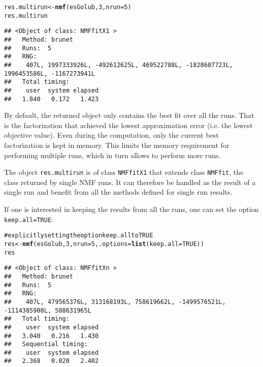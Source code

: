 \documentclass[a4paper]{article}\usepackage{graphicx, color}
\makeatletter
\newcommand{\hlfunctioncall}[1]{\textcolor[rgb]{0.501960784313725,0,0.329411764705882}{\textbf{#1}}}%
\newcommand{\hlcomment}[1]{\textcolor[rgb]{0.180392156862745,0.6,0.341176470588235}{#1}}%
\newenvironment{kframe}{%
 \def\at@end@of@kframe{}%
 \ifinner\ifhmode%
  \def\at@end@of@kframe{\end{minipage}}%
  \begin{minipage}{\columnwidth}%
 \fi\fi%
 \def\FrameCommand##1{\hskip\@totalleftmargin \hskip-\fboxsep
 \colorbox{shadecolor}{##1}\hskip-\fboxsep
     \hskip-\linewidth \hskip-\@totalleftmargin \hskip\columnwidth}%
 \MakeFramed {\advance\hsize-\width
   \@totalleftmargin\z@ \linewidth\hsize
   \@setminipage}}%
 {\par\unskip\endMakeFramed%
 \at@end@of@kframe}
\newenvironment{knitrout}{}{} %
\let\code=\texttt
\makeatother
\begin{document}
\begin{knitrout}
\color{fgcolor}\begin{kframe}
\begin{alltt}
res.multirun <- \hlfunctioncall{nmf}(esGolub, 3, nrun = 5)
res.multirun
\end{alltt}
\begin{verbatim}
## <Object of class: NMFfitX1 >
##   Method: brunet 
##   Runs:  5 
##   RNG:
##    407L, 1997333926L, -492612625L, 469522788L, -1828607723L, 1996453586L, -1167273941L 
##   Total timing:
##    user  system elapsed 
##   1.840   0.172   1.423
\end{verbatim}
\end{kframe}
\end{knitrout}


By default, the returned object only contains the best fit over all the runs.
That is the factorization that achieved the lowest approximation error (i.e. the lowest objective value).
Even during the computation, only the current best factorization is kept in memory.
This limits the memory requirement for performing multiple runs, which in turn allows to perform more runs.

The object \code{res.multirun} is of class \code{NMFfitX1} that extends class \code{NMFfit}, the class returned by single NMF runs. 
It can therefore be handled as the result of a single run and benefit from all the methods defined for single run results.

\medskip
If one is interested in keeping the results from all the runs, one can set the option \code{keep.all=TRUE}:

\begin{knitrout}
\color{fgcolor}\begin{kframe}
\begin{alltt}
\hlcomment{# explicitly setting the option keep.all to TRUE}
res <- \hlfunctioncall{nmf}(esGolub, 3, nrun = 5, .options = \hlfunctioncall{list}(keep.all = TRUE))
res
\end{alltt}
\begin{verbatim}
## <Object of class: NMFfitXn >
##   Method: brunet 
##   Runs:  5 
##   RNG:
##    407L, 479565376L, 313168193L, 758619662L, -1499576521L, -1114385908L, 588631965L 
##   Total timing:
##    user  system elapsed 
##   3.040   0.216   1.430 
##   Sequential timing:
##    user  system elapsed 
##   2.368   0.020   2.402
\end{verbatim}
\end{kframe}
\end{knitrout}
\end{document}
